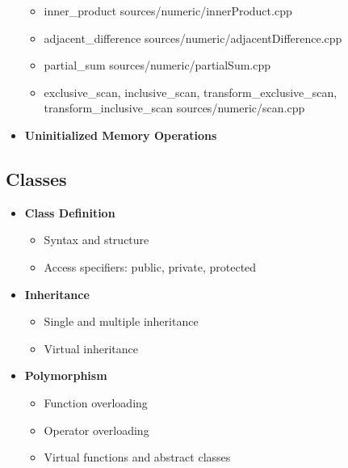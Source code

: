 \documentclass{article}
\begin{document}
\begin{itemize}
\begin{itemize}
            \item inner\_product
               {sources/numeric/innerProduct.cpp}
            \item adjacent\_difference
               {sources/numeric/adjacentDifference.cpp}
            \item partial\_sum
               {sources/numeric/partialSum.cpp}
            \item exclusive\_scan, inclusive\_scan, transform\_exclusive\_scan, transform\_inclusive\_scan
               {sources/numeric/scan.cpp}
          \end{itemize}
        \item \textbf{Uninitialized Memory Operations}
      \end{itemize}
    \subsection{Classes}
      \begin{itemize}
        \item \textbf{Class Definition}
          \begin{itemize}
            \item Syntax and structure
            \item Access specifiers: public, private, protected
          \end{itemize}
        \item \textbf{Inheritance}
          \begin{itemize}
            \item Single and multiple inheritance
            \item Virtual inheritance
          \end{itemize}
        \item \textbf{Polymorphism}
          \begin{itemize}
            \item Function overloading
            \item Operator overloading
            \item Virtual functions and abstract classes
          \end{itemize}
      \end{itemize}
\end{document}
